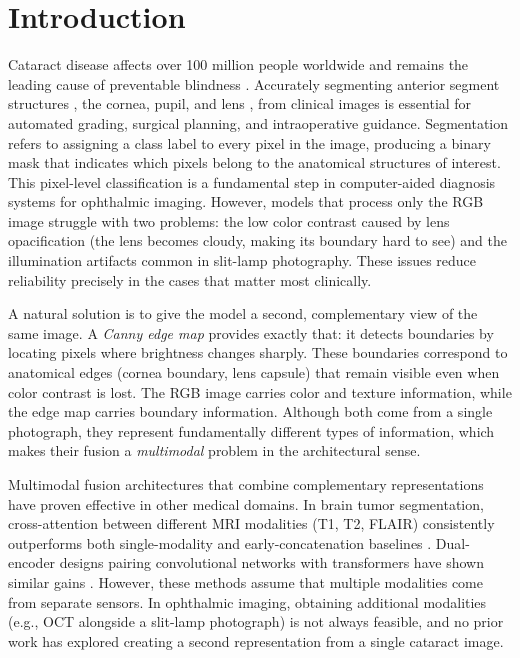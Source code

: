 \section{Introduction}

Cataract disease affects over 100 million people worldwide and remains the leading cause of preventable blindness \cite{wang2024multimodal}. Accurately segmenting anterior segment structures ,  the cornea, pupil, and lens ,  from clinical images is essential for automated grading, surgical planning, and intraoperative guidance. Segmentation refers to assigning a class label to every pixel in the image, producing a binary mask that indicates which pixels belong to the anatomical structures of interest. This pixel-level classification is a fundamental step in computer-aided diagnosis systems for ophthalmic imaging. However, models that process only the RGB image struggle with two problems: the low color contrast caused by lens opacification (the lens becomes cloudy, making its boundary hard to see) and the illumination artifacts common in slit-lamp photography. These issues reduce reliability precisely in the cases that matter most clinically.

A natural solution is to give the model a second, complementary view of the same image. A \textit{Canny edge map} provides exactly that: it detects boundaries by locating pixels where brightness changes sharply. These boundaries correspond to anatomical edges (cornea boundary, lens capsule) that remain visible even when color contrast is lost. The RGB image carries color and texture information, while the edge map carries boundary information. Although both come from a single photograph, they represent fundamentally different types of information, which makes their fusion a \textit{multimodal} problem in the architectural sense.

Multimodal fusion architectures that combine complementary representations have proven effective in other medical domains. In brain tumor segmentation, cross-attention between different MRI modalities (T1, T2, FLAIR) consistently outperforms both single-modality and early-concatenation baselines \cite{zhang2022mmformer}. Dual-encoder designs pairing convolutional networks with transformers have shown similar gains \cite{li2024dectnet}. However, these methods assume that multiple modalities come from separate sensors. In ophthalmic imaging, obtaining additional modalities (e.g., OCT alongside a slit-lamp photograph) is not always feasible, and no prior work has explored creating a second representation from a single cataract image.

